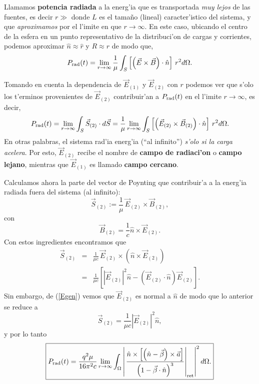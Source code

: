 Llamamos \textbf{potencia radiada} a la energ'ia que es transportada \textit{muy lejos} de las fuentes, es decir $r\gg $ donde $L$ es el tama\~no (lineal) caracter'istico del sistema, y que \textit{aproximamos} por el l'imite en que $r\rightarrow\infty$. En este caso, ubicando el centro de la esfera en un punto representativo de la distribuci'on de cargas y corrientes, podemos aproximar $\hat{n}\approx\hat{r}$ y $R\approx r$ de modo que,
\begin{equation}
P_{\rm rad} (t)=\lim_{r\rightarrow\infty}\frac{1}{\mu}\int_S \left[ \left(
\vec{E}\times\vec{B}\right) \cdot \hat{n}\right] \,r^2 d\Omega.
\end{equation}

Tomando en cuenta la dependencia de $\vec{E}_{(1)}$ y $\vec{E}_{(2)}$ con $r$
podemos ver que s'olo los t'erminos provenientes de $\vec{E}_{(2)}$
contribuir'an a $P_{\rm rad}(t)$ en el l'imite $r\rightarrow\infty$, es decir,
\begin{equation}\label{Pinf1}
P_{\rm rad}(t)=\lim_{r\rightarrow\infty}\int_S \vec{S}_{(2)}\cdot
d\vec{S}=\frac{1}{\mu}\lim_{r\rightarrow\infty}\int_S \left[ \left(
\vec{E}_{(2)}\times\vec{B}_{(2)}\right) \cdot \hat{n}\right] \,r^2 d\Omega.
\end{equation}
En otras palabras, el sistema rad'ia energ'ia (``al infinito'') \textit{s'olo si la
carga acelera}. Por esto, $\vec{E}_{(2)}$ recibe el nombre de \textbf{campo de
radiaci'on} o \textbf{campo lejano}, mientras que $\vec{E}_{(1)}$ es llamado
\textbf{campo cercano}.

Calculamos ahora la parte del vector de Poynting que contribuir'a a la energ'ia
radiada fuera del sistema (al infinito):
\begin{equation}
 \vec{S}_{(2)}:=\frac{1}{\mu}\, \vec{E}_{(2)}\times\vec{B}_{(2)},
\end{equation}
con
\begin{equation}
\vec{B}_{(2)}= \frac{1}{c}\hat{n}\times\vec{E}_{(2)}.
\end{equation}
Con estos ingredientes encontramos que
\begin{eqnarray}
 \vec{S}_{(2)}&=&\frac{1}{\mu c}\, \vec{E}_{(2)}\times\left(
\hat{n}\times\vec{E}_{(2)}\right) \\
 &=& \frac{1}{\mu c}\left[ \left|\vec{E}_{(2)}\right|^2 \hat{n}-\left(
\vec{E}_{(2)}\cdot\hat{n}\right)  \vec{E}_{(2)}\right].
\end{eqnarray}
Sin embargo, de (\ref{Egen}) vemos que $\vec{E}_{(2)}$ es normal a $\hat{n}$ de
modo que lo anterior se reduce a
\begin{equation}\label{S2E}
 \boxed{\vec{S}_{(2)}= \frac{1}{\mu c} \left|\vec{E}_{(2)}\right|^2 \hat{n},}
\end{equation}
y por lo tanto
\begin{equation}
 \boxed{P_{\rm rad} (t)=\frac{q^2\mu}{16\pi^2c}\lim_{r\rightarrow\infty}\int_\Omega
\left|\left.\frac{\hat{n}\times\left[ \left( \hat{n}-\vec{\beta}\right)
\times{\vec{a}}\right] }{\left( 1-\vec{\beta}\cdot\hat{n}\right)
^3}\right|_{\rm ret}\right|^2 d\Omega.}
\end{equation}

